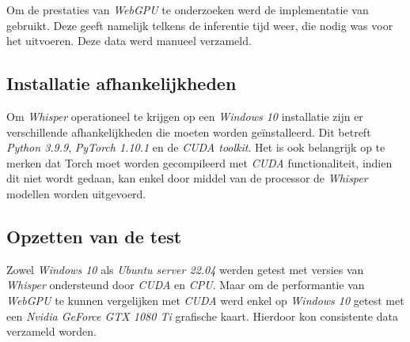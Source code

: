 \bigbreak{}

Om de prestaties van \textit{WebGPU} te onderzoeken werd de implementatie van \textcite{Fleetwood2024} gebruikt. Deze geeft namelijk telkens de inferentie tijd weer, die nodig was voor het uitvoeren. Deze data werd manueel verzameld.

\bigbreak{}

\subsection{Installatie afhankelijkheden}

Om \textit{Whisper} operationeel te krijgen op een \textit{Windows 10} installatie zijn er verschillende afhankelijkheden die moeten worden geïnstalleerd. Dit betreft \textit{Python 3.9.9}, \textit{PyTorch 1.10.1} en de \textit{CUDA toolkit}. Het is ook belangrijk op te merken dat Torch moet worden gecompileerd met \textit{CUDA} functionaliteit, indien dit niet wordt gedaan, kan enkel door middel van de processor de \textit{Whisper} modellen worden uitgevoerd.

\subsection{Opzetten van de test}

Zowel \textit{Windows 10} als \textit{Ubuntu server 22.04} werden getest met versies van \textit{Whisper} ondersteund door \textit{CUDA} en \textit{CPU}. Maar om de performantie van \textit{WebGPU} te kunnen vergelijken met \textit{CUDA} werd enkel op \textit{Windows 10} getest met een \textit{Nvidia GeForce GTX 1080 Ti} grafische kaart. Hierdoor kon consistente data verzameld worden.

\break{}



\begin{figure}
    \centering
    
\end{figure}

